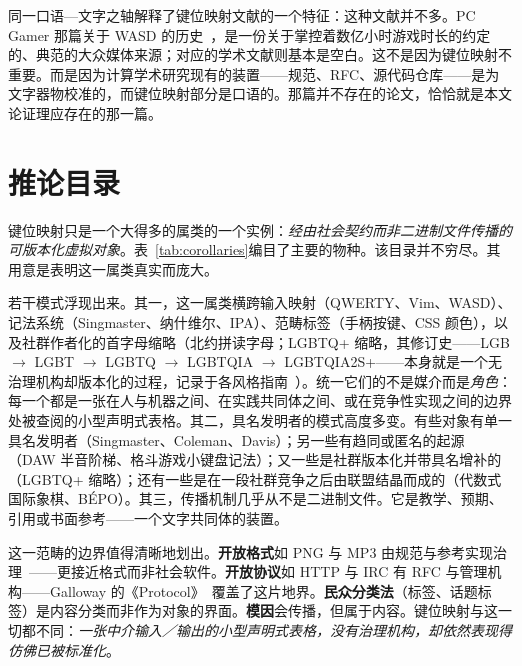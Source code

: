 \documentclass[10pt,letterpaper,twocolumn]{article}
\begin{document}
同一口语—文字之轴解释了键位映射文献的一个特征：这种文献并不多。PC Gamer 那篇关于 WASD 的历史~\citep{fenlon2016wasd}，是一份关于掌控着数亿小时游戏时长的约定的、典范的大众媒体来源；对应的学术文献则基本是空白。这不是因为键位映射不重要。而是因为计算学术研究现有的装置——规范、RFC、源代码仓库——是为文字器物校准的，而键位映射部分是口语的。那篇并不存在的论文，恰恰就是本文论证理应存在的那一篇。

\section{推论目录}
\label{sec:corollaries}

键位映射只是一个大得多的属类的一个实例：\emph{经由社会契约而非二进制文件传播的可版本化虚拟对象}。表~\ref{tab:corollaries}编目了主要的物种。该目录并不穷尽。其用意是表明这一属类真实而庞大。

若干模式浮现出来。其一，这一属类横跨输入映射（QWERTY、Vim、WASD）、记法系统（Singmaster、纳什维尔、IPA）、范畴标签（手柄按键、CSS 颜色），以及社群作者化的首字母缩略（北约拼读字母；LGBTQ+ 缩略，其修订史——LGB $\rightarrow$ LGBT $\rightarrow$ LGBTQ $\rightarrow$ LGBTQIA $\rightarrow$ LGBTQIA2S+——本身就是一个无治理机构却版本化的过程，记录于各风格指南~\citep{glaad_reference_guide}）。统一它们的不是媒介而是\emph{角色}：每一个都是一张在人与机器之间、在实践共同体之间、或在竞争性实现之间的边界处被查阅的小型声明式表格。其二，具名发明者的模式高度多变。有些对象有单一具名发明者（Singmaster、Coleman、Davis）；另一些有趋同或匿名的起源（DAW 半音阶梯、格斗游戏小键盘记法）；又一些是社群版本化并带具名增补的（LGBTQ+ 缩略）；还有一些是在一段社群竞争之后由联盟结晶而成的（代数式国际象棋、BÉPO）。其三，传播机制几乎从不是二进制文件。它是教学、预期、引用或书面参考——一个文字共同体的装置。

这一范畴的边界值得清晰地划出。\textbf{开放格式}如 PNG 与 MP3 由规范与参考实现治理~\citep{sterne2012mp3}——更接近格式而非社会软件。\textbf{开放协议}如 HTTP 与 IRC 有 RFC 与管理机构——Galloway 的《Protocol》~\citep{galloway2004protocol}覆盖了这片地界。\textbf{民众分类法}（标签、话题标签）是内容分类而非作为对象的界面。\textbf{模因}会传播，但属于内容。键位映射与这一切都不同：\emph{一张中介输入／输出的小型声明式表格，没有治理机构，却依然表现得仿佛已被标准化}。
\end{document}
